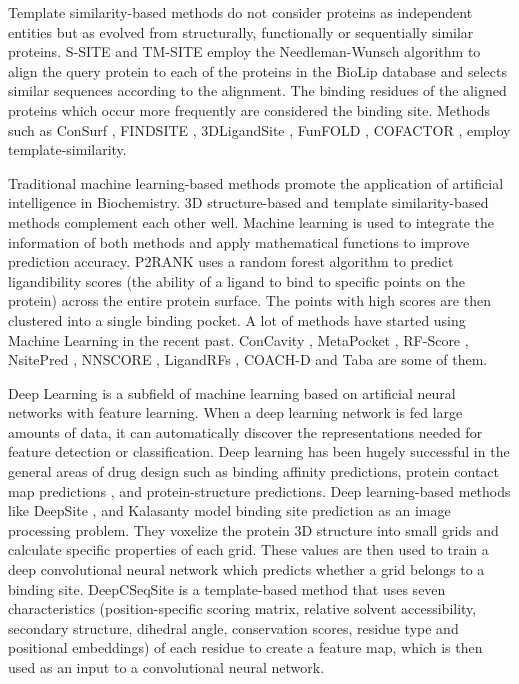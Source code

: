 \documentclass[journal=jacsat,manuscript=article]{achemso}
\begin{document}
Template similarity-based methods do not consider proteins as independent entities but as evolved from structurally, functionally or sequentially similar proteins. S-SITE and TM-SITE \cite{yang2013protein} employ the Needleman-Wunsch algorithm to align the query protein to each of the proteins in the BioLip \cite{yang2012biolip} database and selects similar sequences according to the alignment. The binding residues of the aligned proteins which occur more frequently are considered the binding site. Methods such as ConSurf \cite{glaser2003consurf}, FINDSITE \cite{brylinski2008threading}, 3DLigandSite \cite{wass20103dligandsite}, FunFOLD \cite{roche2011funfold}, COFACTOR \cite{roy2012recognizing}, employ template-similarity.

Traditional machine learning-based methods promote the application of artificial intelligence in Biochemistry. 3D structure-based and template similarity-based methods complement each other well. Machine learning is used to integrate the information of both methods and apply mathematical functions to improve prediction accuracy. P2RANK \cite{krivak2015improving} \cite{krivak2018p2rank} uses a random forest algorithm to predict ligandibility scores (the ability of a ligand to bind to specific points on the protein) across the entire protein surface. The points with high scores are then clustered into a single binding pocket. A lot of methods have started using Machine Learning in the recent past. ConCavity \cite{capra2009predicting}, MetaPocket \cite{huang2009metapocket}, RF-Score \cite{ballester2010machine}, NsitePred \cite{chen2012prediction}, NNSCORE \cite{durrant2010nnscore} \cite{durrant2011nnscore}, LigandRFs \cite{chen2014ligandrfs}, COACH-D \cite{wu2018coach} and Taba \cite{da2020taba} are some of them.

Deep Learning is a subfield of machine learning based on artificial neural networks with feature learning. When a deep learning network is fed large amounts of data, it can automatically discover the representations needed for feature detection or classification. Deep learning has been hugely successful in the general areas of drug design such as binding affinity predictions\cite{jimenez2018k,ozturk2018deepdta}, protein contact map predictions \cite{hanson2018accurate,wang2017accurate}, and protein-structure predictions\cite{senior2020improved,li2019ensembling}. Deep learning-based methods like DeepSite \cite{jimenez2017deepsite}, and Kalasanty \cite{stepniewska2020improving} model binding site prediction as an image processing problem. They voxelize the protein 3D structure into small grids and calculate specific properties of each grid. These values are then used to train a deep convolutional neural network which predicts whether a grid belongs to a binding site. DeepCSeqSite \cite{cui2019predicting} is a template-based method that uses seven characteristics (position-specific scoring matrix, relative solvent accessibility, secondary structure, dihedral angle, conservation scores, residue type and positional embeddings) of each residue to create a feature map, which is then used as an input to a convolutional neural network.
\end{document}
